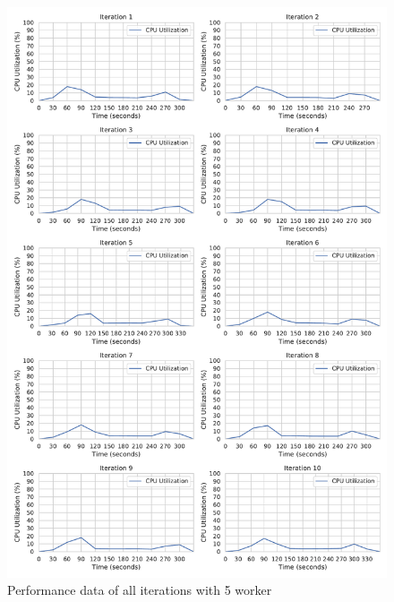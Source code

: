 \begin{figure}[h]
\centering
\includegraphics[scale=0.4]{images/07_evaluation/regression/5_worker_cpu_performance}
\caption{Performance data of all iterations with 5 worker}
\label{fig:appendix_eval_regression_static5}
\end{figure}

